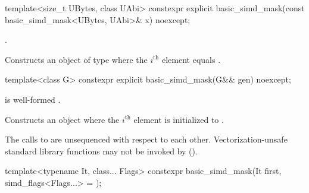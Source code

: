 \begin{itemdecl}
template<size_t UBytes, class UAbi>
  constexpr explicit basic_simd_mask(const basic_simd_mask<UBytes, UAbi>& x) noexcept;
\end{itemdecl}

\begin{itemdescr}
  \pnum\constraints
  .

  \pnum\effects
  Constructs an object of type  where the $i^\text{th}$ element equals  \foralli.
\end{itemdescr}

\begin{itemdecl}
template<class G> constexpr explicit basic_simd_mask(G&& gen) noexcept;
\end{itemdecl}

\begin{itemdescr}
  \pnum\constraints
   is well-formed \foralli.

  \pnum\effects
  Constructs an object where the $i^\text{th}$ element is initialized to .

  \pnum
  The calls to  are unsequenced with respect to each other.
  Vectorization-unsafe standard library functions may not be invoked by  ().
\end{itemdescr}

\newcommand\MaskLoadDescr[2]{
  \pnum\constraints
  \begin{itemize}
    \item \tcode{iter_value_t<It>} is of type \tcode{bool}, and
    \item \tcode{It} satisfies \tcode{contiguous_iterator}.
  \end{itemize}

  \pnum\expects
  \begin{itemize}
    \item #1
    \item \tcode{It} models \tcode{contiguous_iterator}.
    \flagsRequires{basic_simd_mask}{value_type}
  \end{itemize}

  \pnum\effects #2

  \pnum\throws Nothing.
}

\begin{itemdecl}
template<typename It, class... Flags>
  constexpr basic_simd_mask(It first, simd_flags<Flags...> = {});
\end{itemdecl}

